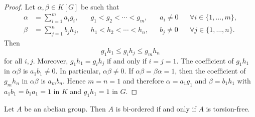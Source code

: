 \begin{proof}
	Let $\alpha,\beta\in K[G]$ be such that  
	\begin{align*}
		\alpha&=\sum_{i=1}^m a_ig_i, && g_1<g_2<\cdots<g_m,&& a_i\ne 0 && \forall i\in\{1,\dots,m\},\\
		\beta&=\sum_{j=1}^n b_jh_j, && h_1<h_2<\cdots<h_n, && b_j\ne 0 && \forall j\in\{1,\dots,n\}.
	\end{align*}
	Then 
	\[
		g_1h_1\leq g_ih_j\leq g_mh_n
	\]
	for all $i,j$. Moreover, $g_1h_1=g_ih_j$ if and only if $i=j=1$. The
	coefficient of $g_1h_1$ in $\alpha\beta$ is $a_1b_1\ne 0$. In particular, 
	$\alpha\beta\ne0$. If $\alpha\beta=\beta\alpha=1$, then the coefficient of
	$g_mh_n$ in $\alpha\beta$ is $a_mb_n$. Hence $m=n=1$ and therefore 
	$\alpha=a_1g_1$ and $\beta=b_1h_1$ with $a_1b_1=b_1a_1=1$ in $K$ and $g_1h_1=1$
	in $G$.
\end{proof}

\begin{theorem}[Levi]
	\label{thm:Levi}
	Let $A$ be an abelian group. Then $A$ is bi-ordered if and only
	if $A$ is torsion-free.
\end{theorem}

